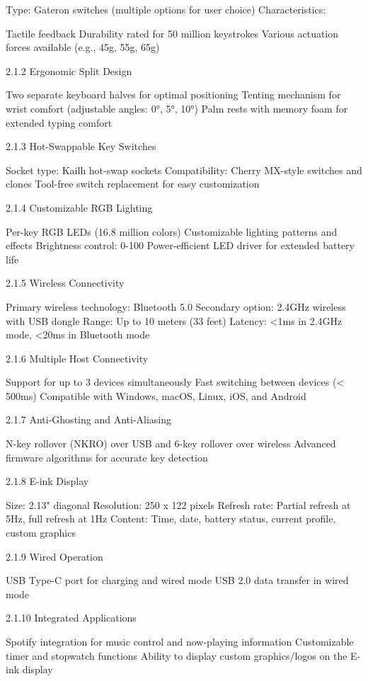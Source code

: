 \documentclass[a4paper,11pt]{article}%
\begin{document}
Type: Gateron switches (multiple options for user choice)
Characteristics:

Tactile feedback
Durability rated for 50 million keystrokes
Various actuation forces available (e.g., 45g, 55g, 65g)



2.1.2 Ergonomic Split Design

Two separate keyboard halves for optimal positioning
Tenting mechanism for wrist comfort (adjustable angles: 0°, 5°, 10°)
Palm rests with memory foam for extended typing comfort

2.1.3 Hot-Swappable Key Switches

Socket type: Kailh hot-swap sockets
Compatibility: Cherry MX-style switches and clones
Tool-free switch replacement for easy customization

2.1.4 Customizable RGB Lighting

Per-key RGB LEDs (16.8 million colors)
Customizable lighting patterns and effects
Brightness control: 0-100%
Power-efficient LED driver for extended battery life

2.1.5 Wireless Connectivity

Primary wireless technology: Bluetooth 5.0
Secondary option: 2.4GHz wireless with USB dongle
Range: Up to 10 meters (33 feet)
Latency: <1ms in 2.4GHz mode, <20ms in Bluetooth mode

2.1.6 Multiple Host Connectivity

Support for up to 3 devices simultaneously
Fast switching between devices (< 500ms)
Compatible with Windows, macOS, Linux, iOS, and Android

2.1.7 Anti-Ghosting and Anti-Aliasing

N-key rollover (NKRO) over USB and 6-key rollover over wireless
Advanced firmware algorithms for accurate key detection

2.1.8 E-ink Display

Size: 2.13" diagonal
Resolution: 250 x 122 pixels
Refresh rate: Partial refresh at 5Hz, full refresh at 1Hz
Content: Time, date, battery status, current profile, custom graphics

2.1.9 Wired Operation

USB Type-C port for charging and wired mode
USB 2.0 data transfer in wired mode

2.1.10 Integrated Applications

Spotify integration for music control and now-playing information
Customizable timer and stopwatch functions
Ability to display custom graphics/logos on the E-ink display
\end{document}
